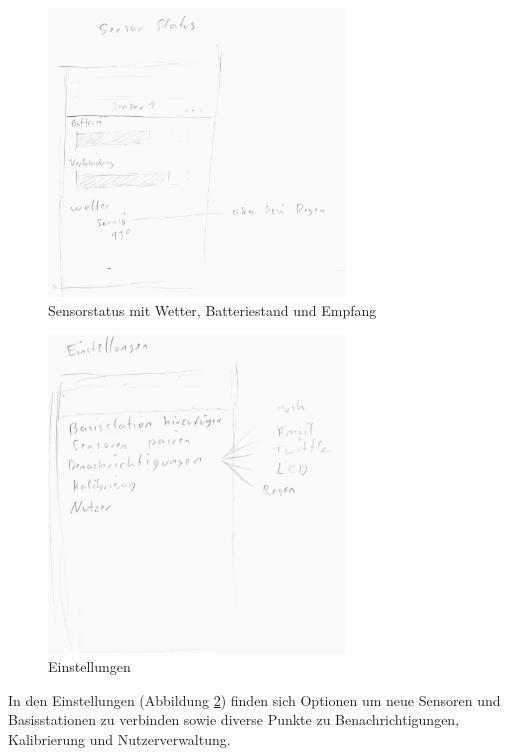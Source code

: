 \begin{figure}[htb] 
	\centerline{\includegraphics*[width=0.7\textwidth]{./Designs/AppGUIConcept_sensorStatus}}
	\caption{Sensorstatus mit Wetter, Batteriestand und Empfang}
	\label{gui_sensor_status}
\end{figure}
\begin{figure}[htb] 
	\centerline{\includegraphics*[width=0.7\textwidth]{./Designs/AppGUIConcept_settings}}
	\caption{Einstellungen}
	\label{gui_settings}
\end{figure}
In den Einstellungen (Abbildung \ref{gui_settings}) finden sich Optionen um neue Sensoren und Basisstationen zu verbinden sowie diverse Punkte zu Benachrichtigungen, Kalibrierung und Nutzerverwaltung.
\FloatBarrier

